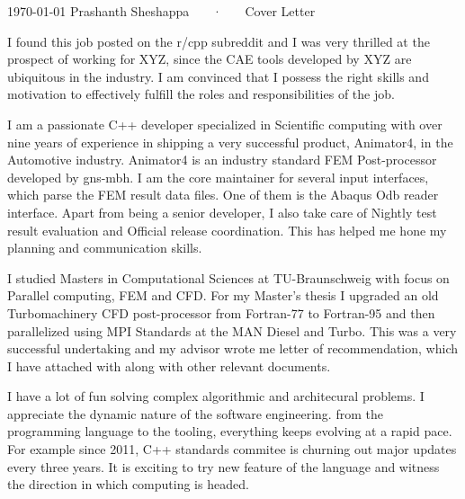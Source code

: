 \documentclass[11pt, a4paper]{awesome-cv}
\begin{document}
\makecvheader[R]

\makecvfooter
  {\today}
  {Prashanth Sheshappa ~~~·~~~ Cover Letter}
  {}

\makelettertitle

\begin{cvletter}


I found this job posted on the r/cpp subreddit and I was very thrilled at the prospect of working for XYZ, since
the CAE tools developed by XYZ are ubiquitous in the industry. 
I am convinced that I possess the right skills and motivation to effectively fulfill the roles and responsibilities of the job.
%     

I am a passionate C++ developer specialized in Scientific computing with over nine years of experience in shipping a
 very successful product, Animator4, in the Automotive industry. 
Animator4 is an industry standard FEM Post-processor developed by gns-mbh.  
I am the core maintainer for several input interfaces, which parse the FEM result data files. 
One of them is the Abaqus Odb reader interface.
Apart from being a senior developer, I also take care of Nightly test result evaluation and Official release coordination. 
This has helped me hone my planning and communication skills.

I studied Masters in Computational Sciences at TU-Braunschweig with focus on Parallel computing, FEM and CFD. For my Master's thesis 
I upgraded an old Turbomachinery CFD post-processor from Fortran-77 to Fortran-95 and then parallelized using MPI Standards at the 
MAN Diesel and Turbo. 
This was a very successful undertaking and my advisor wrote me letter of recommendation, 
which I have attached with along with other relevant documents. 

I have a lot of fun solving complex algorithmic and architecural problems. I appreciate the dynamic nature of the software engineering. from the programming language to the tooling, everything keeps evolving at a rapid pace. For example since 2011, C++ standards commitee is churning out major updates every three years. It is exciting to try new feature of the language and witness the direction in which computing is headed.




\end{cvletter}
\end{document}
